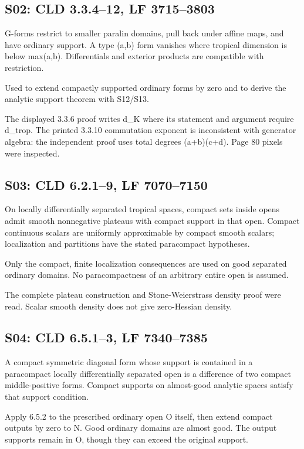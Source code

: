 \documentclass[11pt]{article}
\begin{document}
\subsection*{S02: CLD 3.3.4--12, LF 3715--3803}

G-forms restrict to smaller paralin domains, pull back under affine maps, and have ordinary support. A type (a,b) form vanishes where tropical dimension is below max(a,b). Differentials and exterior products are compatible with restriction.

Used to extend compactly supported ordinary forms by zero and to derive the analytic support theorem with S12/S13.

The displayed 3.3.6 proof writes d\_K where its statement and argument require d\_trop. The printed 3.3.10 commutation exponent is inconsistent with generator algebra: the independent proof uses total degrees (a+b)(c+d). Page 80 pixels were inspected.

\subsection*{S03: CLD 6.2.1--9, LF 7070--7150}

On locally differentially separated tropical spaces, compact sets inside opens admit smooth nonnegative plateaus with compact support in that open. Compact continuous scalars are uniformly approximable by compact smooth scalars; localization and partitions have the stated paracompact hypotheses.

Only the compact, finite localization consequences are used on good separated ordinary domains. No paracompactness of an arbitrary entire open is assumed.

The complete plateau construction and Stone-Weierstrass density proof were read. Scalar smooth density does not give zero-Hessian density.

\subsection*{S04: CLD 6.5.1--3, LF 7340--7385}

A compact symmetric diagonal form whose support is contained in a paracompact locally differentially separated open is a difference of two compact middle-positive forms. Compact supports on almost-good analytic spaces satisfy that support condition.

Apply 6.5.2 to the prescribed ordinary open O itself, then extend compact outputs by zero to N. Good ordinary domains are almost good. The output supports remain in O, though they can exceed the original support.
\end{document}
